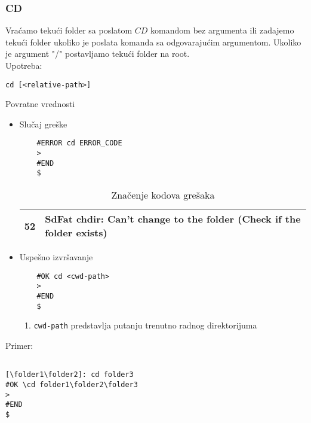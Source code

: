 \documentclass[a4paper]{extarticle}
\begin{document}
\subsubsection{CD}
Vraćamo tekući folder sa poslatom $CD$ komandom bez argumenta ili zadajemo tekući folder ukoliko je poslata komanda sa odgovarajućim argumentom. Ukoliko je argument "/" postavljamo tekući folder na root.\\
Upotreba:
\begin{verbatim}
cd [<relative-path>]
\end{verbatim}
Povratne vrednosti
\begin{itemize}
	\item Slučaj greške\\
	\begin{verbatim}
	#ERROR cd ERROR_CODE
	>
	#END
	$
	\end{verbatim}
	
	\begin{table}[h]
		\centering
		\begin{tabular}{|l|l|}
			\hline
			52 & SdFat chdir: Can't change to the folder (Check if the folder exists) \\ \hline
		\end{tabular}
		\caption{Značenje kodova grešaka}
		\label{tab:my-table}
	\end{table}
	\item Uspešno izvršavanje\\
	\begin{verbatim}
	#OK cd <cwd-path>
	>
	#END
	$
	\end{verbatim}
	\begin{enumerate}
		\item \verb|cwd-path| predstavlja putanju trenutno radnog direktorijuma
	\end{enumerate}
\end{itemize}
Primer:
\begin{verbatim}

[\folder1\folder2]: cd folder3
#OK \cd folder1\folder2\folder3
>
#END
$
\end{verbatim}
\end{document}
